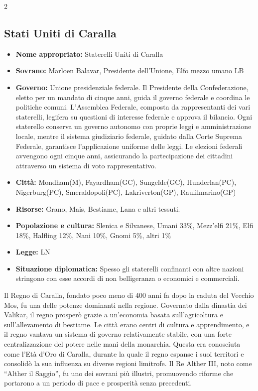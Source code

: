 \documentclass[10pt, a4paper]{report}
\begin{document}
\begin{multicols}{2}
\subsection*{Stati Uniti di Caralla}
\begin{itemize}
	\item \textbf{Nome appropriato:} Staterelli Uniti di Caralla
	\item \textbf{Sovrano:} Marloen Balavar, Presidente dell'Unione, Elfo mezzo umano LB
	\item \textbf{Governo:} Unione presidenziale federale. Il Presidente della Confederazione, eletto per un mandato di cinque anni, guida il governo federale e coordina le politiche comuni. L'Assemblea Federale, composta da rappresentanti dei vari staterelli, legifera su questioni di interesse federale e approva il bilancio. Ogni staterello conserva un governo autonomo con proprie leggi e amministrazione locale, mentre il sistema giudiziario federale, guidato dalla Corte Suprema Federale, garantisce l’applicazione uniforme delle leggi. Le elezioni federali avvengono ogni cinque anni, assicurando la partecipazione dei cittadini attraverso un sistema di voto rappresentativo.
	\item \textbf{Città:} Mondham(M), Fayardham(GC), Sungelde(GC), Hunderlan(PC), Nigerburg(PC), Smeraldopoli(PC), Lakriverton(GP), Raulilmarino(GP)
	\item \textbf{Risorse:} Grano, Mais, Bestiame, Lana e altri tessuti.
	\item \textbf{Popolazione e cultura:} Slenica e Silvanese, Umani 33\%, Mezz'elfi 21\%, Elfi 18\%, Halfling 12\%, Nani 10\%, Gnomi 5\%, altri 1\%
	\item \textbf{Legge:} LN
	\item \textbf{Situazione diplomatica:} Spesso gli staterelli confinanti con altre nazioni stringono con esse accordi di non belligeranza o economici e commerciali.
\end{itemize}
Il Regno di Caralla, fondato poco meno di 400 anni fa dopo la caduta del Vecchio Mos, fu una delle potenze dominanti nella regione. Governato dalla dinastia dei Valikar, il regno prosperò grazie a un'economia basata sull'agricoltura e sull'allevamento di bestiame. Le città erano centri di cultura e apprendimento, e il regno vantava un sistema di governo relativamente stabile, con una forte centralizzazione del potere nelle mani della monarchia.
Questa era conosciuta come l'Età d'Oro di Caralla, durante la quale il regno espanse i suoi territori e consolidò la sua influenza su diverse regioni limitrofe. Il Re Alther III, noto come “Alther il Saggio”, fu uno dei sovrani più illustri, promuovendo riforme che portarono a un periodo di pace e prosperità senza precedenti.

\end{multicols}
\end{document}
